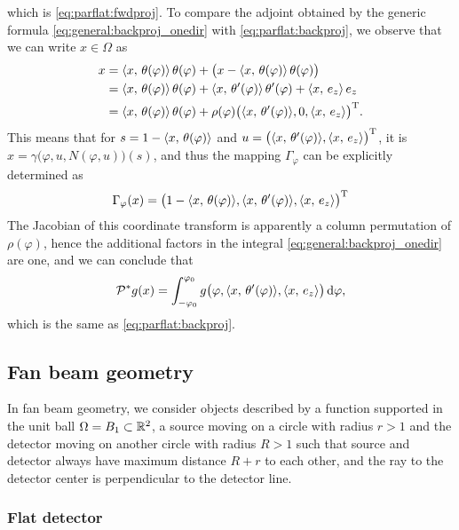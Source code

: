 \documentclass{amsart}
\renewcommand*{\phi}{\varphi}
\begin{document}
%
which is \eqref{eq:parflat:fwdproj}. To compare the adjoint obtained by the generic formula \eqref{eq:general:backproj_onedir} with 
\eqref{eq:parflat:backproj}, we observe that we can write $x \in \Omega$ as
%
\begin{align*}
 x 
 &= \INNER{x}{\theta(\phi)}\, \theta(\phi) + \big(x - \INNER{x}{\theta(\phi)}\, \theta(\phi)\big) \\
 &= \INNER{x}{\theta(\phi)}\, \theta(\phi) + \INNER{x}{\theta'(\phi)}\, \theta'(\phi) + \INNER{x}{e_z}\, e_z \\
 &= \INNER{x}{\theta(\phi)}\, \theta(\phi) + \rho(\phi) \TRANSP{\big(\INNER{x}{\theta'(\phi)}, 0, \INNER{x}{e_z}\big)}.
\end{align*}
%
This means that for $s = 1 - \INNER{x}{\theta(\phi)}$ and $u = \TRANSP{\big(\INNER{x}{\theta'(\phi)}, \INNER{x}{e_z}\big)}$, it is 
$x = \gamma\big(\phi, u, N(\phi, u)\big)(s)$, and thus the mapping $\Gamma_\phi$ can be explicitly determined as
%
\begin{equation*}
 \Gamma_\phi(x) = \TRANSP{\big(1 - \INNER{x}{\theta(\phi)}, \INNER{x}{\theta'(\phi)}, \INNER{x}{e_z}\big)}
\end{equation*}
%
The Jacobian of this coordinate transform is apparently a column permutation of $\rho(\phi)$, hence the additional factors in the integral 
\eqref{eq:general:backproj_onedir} are one, and we can conclude that
%
\begin{equation*}
 \DUALOPP g(x) = \int_{-\phi_0}^{\phi_0} g\big(\phi, \INNER{x}{\theta'(\phi)}, \INNER{x}{e_z}\big)\, \D\phi,
\end{equation*}
%
which is the same as \eqref{eq:parflat:backproj}.%
\vspace{5ex}%



\subsection{Fan beam geometry}
\label{sec:applications:fanbeam}

In fan beam geometry, we consider objects described by a function supported in the unit ball $\Omega = B_1 \subset {\ensuremath{\mathbb{R}}}^2$, a source moving 
on a circle with radius $r > 1$ and the detector moving on another circle with radius $R > 1$ such that source and detector always have 
maximum distance $R+r$ to each other, and the ray to the detector center is perpendicular to the detector line.

\subsubsection{Flat detector}
\label{sec:applications:fanbeam:flat}
\end{document}
